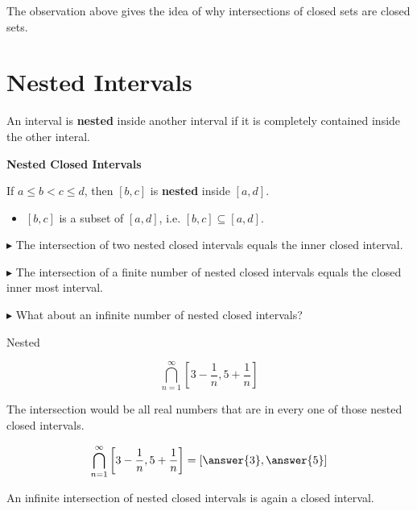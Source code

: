 \documentclass{ximera}
\begin{document}
The observation above gives the idea of why intersections of closed sets are closed sets.
















\section*{Nested Intervals}


An interval is \textbf{nested} inside another interval if it is completely contained inside the other interal.





\textbf{Nested Closed Intervals}

If $a \leq b < c \leq d$, then $[b,c]$ is \textbf{\textcolor{purple!85!blue}{nested}} inside $[a,d]$.   

\begin{itemize}
\item $[b,c]$ is a subset of $[a,d]$, i.e. $[b,c] \subseteq [a,d]$.
\end{itemize}


$\blacktriangleright$  The intersection of two nested closed intervals equals the inner closed interval.

$\blacktriangleright$  The intersection of a finite number of nested closed intervals equals the closed inner most interval.

$\blacktriangleright$ What about an infinite number of nested closed intervals?



\begin{example} Nested


\[ \bigcap_{n=1}^{\infty}   \left[3 - \frac{1}{n}, 5 + \frac{1}{n}\right]     \]



The intersection would be all real numbers that are in every one of those nested closed intervals.


\[ \bigcap_{n=1}^{\infty}   \left[3 - \frac{1}{n}, 5 + \frac{1}{n}\right]  = \left[\answer{3}, \answer{5}\right]   \]





\end{example} 


An infinite intersection of nested closed intervals is again a closed interval. \\
\end{document}
